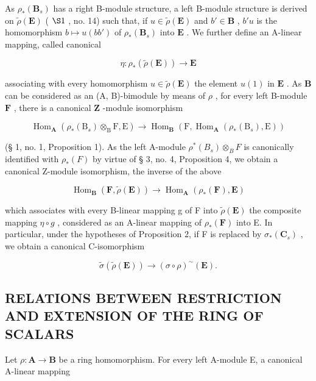 As \(\rho_{*}(\mathbf{B}_{s})\) has a right B-module structure, a left B-module structure is derived on \(\tilde{\rho}(\mathbf{E})\) ( \(\S 1\) , no. 14) such that, if \(u \in \tilde{\rho}(\mathbf{E})\) and \(b' \in \mathbf{B}\) , \(b'u\) is the homomorphism \(b \mapsto u(bb')\) of \(\rho_{*}(\mathbf{B}_{s})\) into \(\mathbf{E}\) . We further define an A-linear mapping, called canonical

\[
\eta : \rho_ {*} (\tilde {\rho} (\mathbf {E})) \rightarrow \mathbf {E}\tag{7}
\]

associating with every homomorphism \(u \in \tilde{\rho}(\mathbf{E})\) the element \(u(1)\) in \(\mathbf{E}\) . As \(\mathbf{B}\) can be considered as an (A, B)-bimodule by means of \(\rho\) , for every left B-module \(\mathbf{F}\) , there is a canonical \(\mathbf{Z}\) -module isomorphism

\[
\operatorname{Hom} _ {\mathbf {A}} \left(\rho_ {*} (\mathrm{B} _ {s}) \otimes_ {\mathrm{B}} \mathrm{F}, \mathrm{E}\right)\rightarrow \operatorname{Hom} _ {\mathbf {B}} (\mathrm{F}, \operatorname{Hom} _ {\mathbf {A}} \left(\rho_ {*} (\mathrm{B} _ {s}), \mathrm{E}\right))
\]

(§ 1, no. 1, Proposition 1). As the left A-module \(\rho^{*}(B_{s}) \otimes_{B} F\) is canonically identified with \(\rho_{*}(F)\) by virtue of § 3, no. 4, Proposition 4, we obtain a canonical Z-module isomorphism, the inverse of the above

\[
\operatorname{Hom} _ {\mathbf {B}} (\mathbf {F}, \tilde {\rho} (\mathbf {E})) \rightarrow \operatorname{Hom} _ {\mathbf {A}} (\rho_ {*} (\mathbf {F}), \mathbf {E})\tag{8}
\]

which associates with every B-linear mapping g of F into \(\tilde{\rho}(\mathbf{E})\) the composite mapping \(\eta \circ g\) , considered as an A-linear mapping of \(\rho_{*}(\mathbf{F})\) into E. In particular, under the hypotheses of Proposition 2, if F is replaced by \(\sigma_{*}(\mathbf{C}_{s})\) , we obtain a canonical C-isomorphism

\[
\tilde {\sigma} (\tilde {\rho} (\mathbf {E})) \rightarrow (\sigma \circ \rho) ^ {\sim} (\mathbf {E}).\tag{9}
\]

\subsection{RELATIONS BETWEEN RESTRICTION AND EXTENSION OF THE RING OF SCALARS}

Let \(\rho: \mathbf{A} \to \mathbf{B}\) be a ring homomorphism. For every left A-module E, a canonical A-linear mapping

